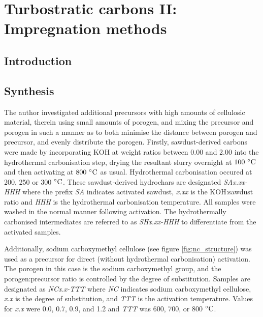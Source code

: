 \chapter{Turbostratic carbons II: Impregnation methods}
\label{ch:impregnation}

\newpage

\section{Introduction}

\section{Synthesis}
The author investigated additional precursors with high amounts of cellulosic material, therein using small amounts of porogen, and mixing the precursor and porogen in such a manner as to both minimise the distance between porogen and precursor, and evenly distribute the porogen. Firstly, sawdust-derived carbons were made by incorporating KOH at weight ratios between 0.00 and 2.00 into the hydrothermal carbonisation step, drying the resultant slurry overnight at $\rm 100\  ^{\circ}C$ and then activating at $\rm 800\ ^{\circ}C$ as usual. Hydrothermal carbonisation occured at 200, 250 or 300 $\rm ^{\circ}C$. These sawdust-derived hydrochars are designated \textit{SAx.xx-HHH} where the prefix \textit{SA} indicates activated sawdust, \textit{x.xx} is the KOH:sawdust ratio and \textit{HHH} is the hydrothermal carbonisation temperature. All samples were washed in the normal manner following activation. The hydrothermally carbonised intermediates are referred to as \textit{SHx.xx-HHH} to differentiate from the activated samples.

Additionally, sodium carboxymethyl cellulose (see figure \ref{fig:nc_structure}) was used as a precursor for direct (without hydrothermal carbonisation) activation. The porogen in this case is the sodium carboxymethyl group, and the porogen:precursor ratio is controlled by the degree of substitution. Samples are designated as \textit{NCx.x-TTT} where \textit{NC} indicates sodium carboxymethyl cellulose, \textit{x.x} is the degree of substitution, and \textit{TTT} is the activation temperature. Values for \textit{x.x} were 0.0, 0.7, 0.9, and 1.2 and \textit{TTT} was 600, 700, or 800 $\rm ^{\circ}C$.

